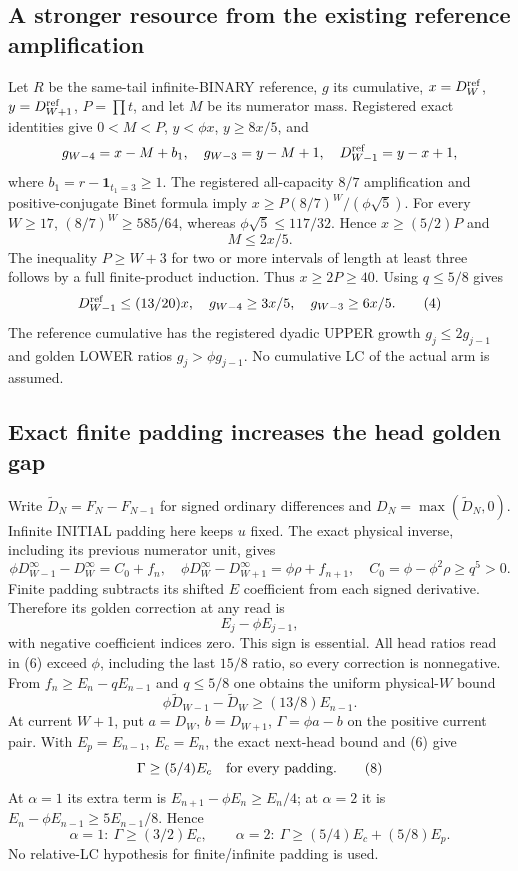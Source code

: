 \subsection*{A stronger resource from the existing reference amplification}
Let $R$ be the same-tail infinite-BINARY reference, $g$ its cumulative,
$x=D^{\rm ref}_W$, $y=D^{\rm ref}_{W+1}$, $P=\prod t$, and let $M$
be its numerator mass. Registered exact identities give $0<M<P$,
$y<\phi x$, $y\ge8x/5$, and
\[
 g_{W-4}=x-M+b_1,\quad g_{W-3}=y-M+1,
 \quad D^{\rm ref}_{W-1}=y-x+1,
\]
where $b_1=r-\mathbf1_{t_1=3}\ge1$.
The registered all-capacity $8/7$ amplification and positive-conjugate
Binet formula imply
$x\ge P(8/7)^W/(\phi\sqrt5)$.
For every $W\ge17$, $(8/7)^W\ge585/64$, whereas
$\phi\sqrt5\le117/32$. Hence $x\ge(5/2)P$ and
\[
                            M\le2x/5.              \tag{3}
\]
The inequality $P\ge W+3$ for two or more intervals of length at least
three follows by a full finite-product induction. Thus $x\ge2P\ge40$.
Using $q\le5/8$ gives
\[
 D^{\rm ref}_{W-1}\le(13/20)x,\quad
 g_{W-4}\ge3x/5,\quad g_{W-3}\ge6x/5.               \tag{4}
\]
The reference cumulative has the registered dyadic UPPER growth
$g_j\le2g_{j-1}$ and golden LOWER ratios $g_j>\phi g_{j-1}$.
No cumulative LC of the actual arm is assumed.

\subsection*{Exact finite padding increases the head golden gap}
Write $\widetilde D_N=F_N-F_{N-1}$ for signed ordinary differences and
$D_N=\max(\widetilde D_N,0)$. Infinite INITIAL padding here keeps $u$
fixed. The exact physical inverse, including its previous numerator
unit, gives
\[
 \phi D^\infty_{W-1}-D^\infty_W=C_0+f_n,
 \quad \phi D^\infty_W-D^\infty_{W+1}=\phi\rho+f_{n+1},
 \quad C_0=\phi-\phi^2\rho\ge q^5>0.                \tag{5}
\]
Finite padding subtracts its shifted $E$ coefficient from each signed
derivative. Therefore its golden correction at any read is
\[
                         E_j-\phi E_{j-1},          \tag{6}
\]
with negative coefficient indices zero. This sign is essential.
All head ratios read in (6) exceed $\phi$, including the last
$15/8$ ratio, so every correction is nonnegative.
From $f_n\ge E_n-qE_{n-1}$ and $q\le5/8$ one obtains the uniform
physical-$W$ bound
\[
 \phi\widetilde D_{W-1}-\widetilde D_W
                         \ge(13/8)E_{n-1}.         \tag{7}
\]
At current $W+1$, put $a=D_W$, $b=D_{W+1}$, $\Gamma=\phi a-b$ on
the positive current pair. With $E_p=E_{n-1}$, $E_c=E_n$, the exact
next-head bound and (6) give
\[
 \Gamma\ge(5/4)E_c\quad\hbox{for every padding}.     \tag{8}
\]
At $\alpha=1$ its extra term is $E_{n+1}-\phi E_n\ge E_n/4$;
at $\alpha=2$ it is $E_n-\phi E_{n-1}\ge5E_{n-1}/8$. Hence
\[
 \alpha=1:\ \Gamma\ge(3/2)E_c,\qquad
 \alpha=2:\ \Gamma\ge(5/4)E_c+(5/8)E_p.             \tag{9}
\]
No relative-LC hypothesis for finite/infinite padding is used.


